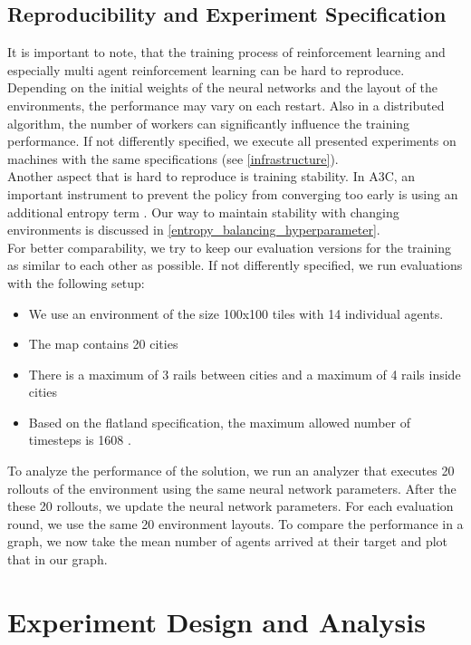 \section[Reproducibility]{Reproducibility and Experiment Specification}\label{reproducability}
It is important to note, that the training process of reinforcement learning and especially multi agent reinforcement learning can be hard to reproduce. Depending on the initial weights of the neural networks and the layout of the environments, the performance may vary on each restart. Also in a distributed algorithm, the number of workers can significantly influence the training performance. If not differently specified, we execute all presented experiments on machines with the same specifications (see \autoref{infrastructure}).\\
Another aspect that is hard to reproduce is training stability. In A3C, an important instrument to prevent the policy from converging too early is using an additional entropy term \cite{a3c}. Our way to maintain stability with changing environments is discussed in \autoref{entropy_balancing_hyperparameter}.\\
For better comparability, we try to keep our evaluation versions for the training as similar to each other as possible. If not differently specified, we run evaluations with the following setup:
\begin{itemize}
	\item We use an environment of the size 100x100 tiles with 14 individual agents.
	\item The map contains 20 cities
	\item There is a maximum of 3 rails between cities and a maximum of 4 rails inside cities
	\item Based on the flatland specification, the maximum allowed number of timesteps is 1608 \cite{flatland_spec}.
\end{itemize}
To analyze the performance of the solution, we run an analyzer that executes 20 rollouts of the environment using the same neural network parameters. After the these 20 rollouts, we update the neural network parameters. For each evaluation round, we use the same 20 environment layouts. 
To compare the performance in a graph, we now take the mean number of agents arrived at their target and plot that in our graph.
\chapter[Experiments]{Experiment Design and Analysis}\label{chap.experiment}
